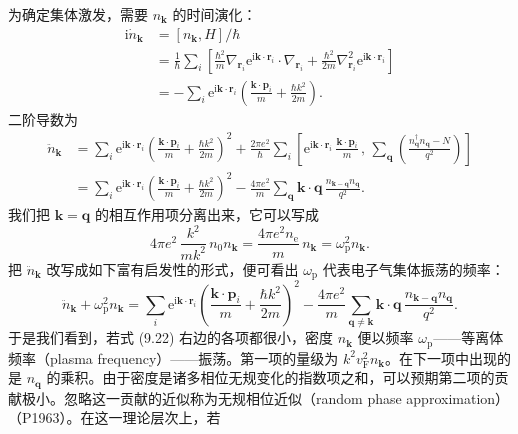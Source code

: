 为确定集体激发，需要 $n_{\mathbf{k}}$ 的时间演化：
\begin{equation*}
\begin{aligned}
\mathrm{i}\dot{n}_{\mathbf{k}}&=[n_{\mathbf{k}},H]/\hbar\\
&=\frac{1}{\hbar}\sum_i\left[\frac{\hbar^2}{m}\nabla_{\mathbf{r}_i}\mathrm{e}^{\mathrm{i}\mathbf{k}\cdot\mathbf{r}_i}\cdot\nabla_{\mathbf{r}_i}+\frac{\hbar^2}{2m}\nabla_{\mathbf{r}_i}^2\mathrm{e}^{\mathrm{i}\mathbf{k}\cdot\mathbf{r}_i}\right]\\
&=-\sum_i\mathrm{e}^{\mathrm{i}\mathbf{k}\cdot\mathbf{r}_i}\left(\frac{\mathbf{k}\cdot\mathbf{p}_i}{m}+\frac{\hbar k^2}{2m}\right).
\end{aligned}\tag{9.19}
\end{equation*}
二阶导数为
\begin{equation*}
\begin{aligned}
\ddot{n}_{\mathbf{k}}&=\sum_i\mathrm{e}^{\mathrm{i}\mathbf{k}\cdot\mathbf{r}_i}\left(\frac{\mathbf{k}\cdot\mathbf{p}_i}{m}+\frac{\hbar k^2}{2m}\right)^{\!2}+\frac{2\pi e^2}{\hbar}\sum_i\left[\mathrm{e}^{\mathrm{i}\mathbf{k}\cdot\mathbf{r}_i}\,\frac{\mathbf{k}\cdot\mathbf{p}_i}{m}\,,\,\sum_{\mathbf{q}}\left(\frac{n_{\mathbf{q}}^{\dagger}n_{\mathbf{q}}-N}{q^2}\right)\right]\\
&=\sum_i\mathrm{e}^{\mathrm{i}\mathbf{k}\cdot\mathbf{r}_i}\left(\frac{\mathbf{k}\cdot\mathbf{p}_i}{m}+\frac{\hbar k^2}{2m}\right)^{\!2}-\frac{4\pi e^2}{m}\sum_{\mathbf{q}}\mathbf{k}\cdot\mathbf{q}\,\frac{n_{\mathbf{k}-\mathbf{q}}n_{\mathbf{q}}}{q^2}.
\end{aligned}\tag{9.20}
\end{equation*}
我们把 $\mathbf{k}=\mathbf{q}$ 的相互作用项分离出来，它可以写成
\begin{equation*}
4\pi e^2\,\frac{k^2}{mk^2}\,n_0n_{\mathbf{k}}=\frac{4\pi e^2n_{\mathrm{e}}}{m}\,n_{\mathbf{k}}=\omega_{\mathrm{p}}^2 n_{\mathbf{k}}.\tag{9.21}
\end{equation*}
把 $\ddot{n}_{\mathbf{k}}$ 改写成如下富有启发性的形式，便可看出 $\omega_{\mathrm{p}}$ 代表电子气集体振荡的频率：
\begin{equation*}
\ddot{n}_{\mathbf{k}}+\omega_{\mathrm{p}}^2 n_{\mathbf{k}}=\sum_i\mathrm{e}^{\mathrm{i}\mathbf{k}\cdot\mathbf{r}_i}\left(\frac{\mathbf{k}\cdot\mathbf{p}_i}{m}+\frac{\hbar k^2}{2m}\right)^{\!2}-\frac{4\pi e^2}{m}\sum_{\mathbf{q}\neq\mathbf{k}}\mathbf{k}\cdot\mathbf{q}\,\frac{n_{\mathbf{k}-\mathbf{q}}n_{\mathbf{q}}}{q^2}.\tag{9.22}
\end{equation*}
于是我们看到，若式 (9.22) 右边的各项都很小，密度 $n_{\mathbf{k}}$ 便以频率 $\omega_{\mathrm{p}}$——等离体频率（plasma frequency）——振荡。第一项的量级为 $k^2v_{\mathrm{F}}^2n_{\mathbf{k}}$。在下一项中出现的是 $n_{\mathbf{q}}$ 的乘积。由于密度是诸多相位无规变化的指数项之和，可以预期第二项的贡献极小。忽略这一贡献的近似称为无规相位近似（random phase approximation）（P1963）。在这一理论层次上，若
